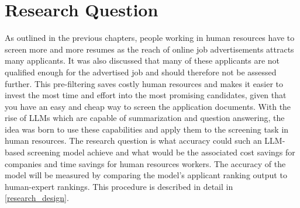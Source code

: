 \documentclass[draft,final]{thesisclass} %
\begin{document}
\section{Research Question}
As outlined in the previous chapters, people working in human resources have to screen more and more resumes as the reach of online job advertisements attracts many applicants.
It was also discussed that many of these applicants are not qualified enough for the advertised job and should therefore not be assessed further.
This pre-filtering saves costly human resources and makes it easier to invest the most time and effort into the most promising candidates, given that you have an easy and cheap way to screen the application documents.
With the rise of \acs{LLM}s which are capable of summarization and question answering, the idea was born to use these capabilities and apply them to the screening task in human resources.
The research question is what accuracy could such an \acs{LLM}-based screening model achieve and what would be the associated cost savings for companies and time savings for human resources workers.
The accuracy of the model will be measured by comparing the model's applicant ranking output to human-expert rankings. This procedure is described in detail in \ref{research_design}.
\end{document}
